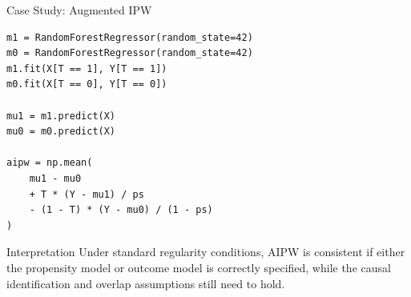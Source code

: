 \documentclass[aspectratio=169,11pt]{beamer}
\begin{document}
\begin{frame}[fragile]{Case Study: Augmented IPW}
\begin{lstlisting}[style=code,basicstyle=\ttfamily\small]
m1 = RandomForestRegressor(random_state=42)
m0 = RandomForestRegressor(random_state=42)
m1.fit(X[T == 1], Y[T == 1])
m0.fit(X[T == 0], Y[T == 0])

mu1 = m1.predict(X)
mu0 = m0.predict(X)

aipw = np.mean(
    mu1 - mu0
    + T * (Y - mu1) / ps
    - (1 - T) * (Y - mu0) / (1 - ps)
)
\end{lstlisting}

\begin{block}{Interpretation}
Under standard regularity conditions, AIPW is consistent if either the propensity model or outcome model is correctly specified, while the causal identification and overlap assumptions still need to hold.
\end{block}
\end{frame}
\end{document}
